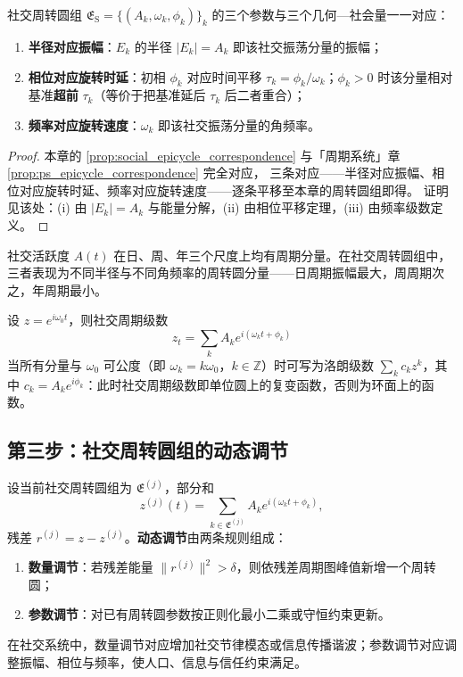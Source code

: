 \begin{proposition}\label{prop:social_epicycle_correspondence}
社交周转圆组 $\mathfrak E_{\mathrm{S}}=\{(A_k,\omega_k,\phi_k)\}_{k}$ 的三个参数与三个几何—社会量一一对应：
\begin{enumerate}[label=(\roman*)]
    \item \textbf{半径对应振幅}：$E_k$ 的半径 $|E_k|=A_k$ 即该社交振荡分量的振幅；
    \item \textbf{相位对应旋转时延}：初相 $\phi_k$ 对应时间平移 $\tau_k=\phi_k/\omega_k$；$\phi_k>0$ 时该分量相对基准\textbf{超前} $\tau_k$（等价于把基准延后 $\tau_k$ 后二者重合）；
    \item \textbf{频率对应旋转速度}：$\omega_k$ 即该社交振荡分量的角频率。
\end{enumerate}
\end{proposition}

\begin{proof}
本章的 \cref{prop:social_epicycle_correspondence} 与「周期系统」章 \cref{prop:ps_epicycle_correspondence} 完全对应，
三条对应——半径对应振幅、相位对应旋转时延、频率对应旋转速度——逐条平移至本章的周转圆组即得。
证明见该处：(i) 由 $|E_k|=A_k$ 与能量分解，(ii) 由相位平移定理，(iii) 由频率级数定义。
\end{proof}

\begin{example}[社交活跃度的周期级数]\label{ex:social_activity_series}
社交活跃度 $A(t)$ 在日、周、年三个尺度上均有周期分量。在社交周转圆组中，三者表现为不同半径与不同角频率的周转圆分量——日周期振幅最大，周周期次之，年周期最小。
\end{example}

\begin{remark}[周期级数即复变函数]\label{rem:social_series_complex}
设 $z=e^{i\omega_0t}$，则社交周期级数
\[
z_t=\sum_k A_k e^{i(\omega_k t+\phi_k)}
\]
当所有分量与 $\omega_0$ 可公度（即 $\omega_k=k\omega_0$，$k\in\mathbb Z$）时可写为洛朗级数 $\sum_k c_k z^k$，其中 $c_k=A_k e^{i\phi_k}$：此时社交周期级数即单位圆上的复变函数，否则为环面上的函数。
\end{remark}

\subsection{第三步：社交周转圆组的动态调节}

\begin{definition}[社交周转圆组的动态调节]\label{def:social_adaptive_adjustment}
设当前社交周转圆组为 $\mathfrak E^{(j)}$，部分和
\[
z^{(j)}(t)=\sum_{k\in\mathfrak E^{(j)}}A_k e^{i(\omega_k t+\phi_k)},
\]
残差 $r^{(j)}=z-z^{(j)}$。\textbf{动态调节}由两条规则组成：
\begin{enumerate}[label=(\roman*)]
    \item \textbf{数量调节}：若残差能量 $\|r^{(j)}\|^2>\delta$，则依残差周期图峰值新增一个周转圆；
    \item \textbf{参数调节}：对已有周转圆参数按正则化最小二乘或守恒约束更新。
\end{enumerate}
在社交系统中，数量调节对应增加社交节律模态或信息传播谐波；参数调节对应调整振幅、相位与频率，使人口、信息与信任约束满足。
\end{definition}

